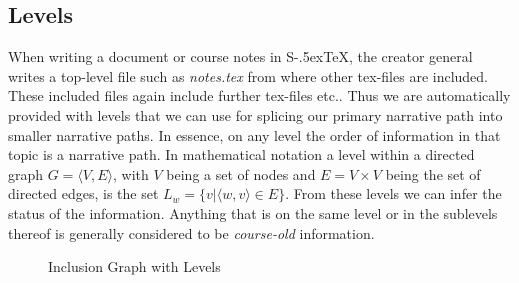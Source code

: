 \documentclass[twoside, 12pt]{article}
\def\stex{\texorpdfstring{\raisebox{-.5ex}S\kern-.5ex\TeX}{sTeX}\xspace}
\begin{document}
\begin{figure}
\vspace{-50pt}
\end{figure}

\subsection{Levels}
\label{sec:levels}

When writing a document or course notes in \stex, the creator general writes a top-level file such as \textit{notes.tex} from where other tex-files are included. These included files again include further tex-files etc.. Thus we are automatically provided with levels that we can use for splicing our primary narrative path into smaller narrative paths. In essence, on any level the order of information in that topic is a narrative path. In mathematical notation a level within a directed graph $G = \langle V, E \rangle $, with $V$ being a set of nodes and $E = V \times V$ being the set of directed edges, is the set $L_w = \lbrace v \vert \langle w, v \rangle \in E \rbrace$. From these levels we can infer the status of the information. Anything that is on the same level or in the sublevels thereof is generally considered to be \textit{course-old} information.\\

\begin{figure}
\vspace{-26pt}
  \begin{center}
\vspace{-5pt}
  \caption{Inclusion Graph with Levels}
  \label{fig:levelsGraph}
\vspace{12pt}
  \end{center}
\end{figure}

\begin{figure}
\vspace{-50pt}
\end{figure}
\end{document}
